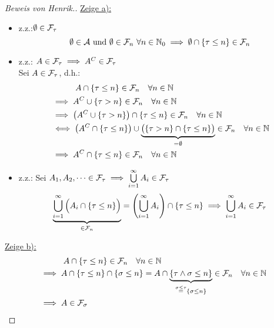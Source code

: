 \documentclass[12pt,a4paper]{article}
\begin{document}
\begin{proof}[Beweis von Henrik.]\enter
\underline{Zeige a):}\\
\begin{itemize} 
	\item z.z.:$\emptyset \in \mathcal{F}_\tau$\\
	\begin{equation*}
		\emptyset \in \mathcal{A} \text{ und } \emptyset \in \mathcal{F}_n\  \forall n \in \mathbb{N}_0 \implies \emptyset \cap \{\tau \leq n\} \in \mathcal{F}_n
	\end{equation*}
	\item z.z.: $A \in \mathcal{F}_\tau \implies A^C \in \mathcal{F}_\tau$\\
	Sei $A \in \mathcal{F}_\tau$, d.h.:
	\begin{align*}
		&{}\qquad \quad  A \cap \{\tau \leq n\} \in \mathcal{F}_n \quad \forall n \in \mathbb{N}\\
		&\implies	A^C \cup \{\tau > n\} \in \mathcal{F}_n \quad \forall n \in \mathbb{N}\\
		&\implies 	\left(	A^C \cup \{\tau > n\}\right) \cap \{\tau \leq n\} \in \mathcal{F}_n \quad \forall n \in \mathbb{N}\\
		& \iff \left(	A^C \cap \{\tau \leq n\}\right) \cup \underbrace{\big ( \{\tau > n\}\cap\{\tau \leq n\} \big )}_{= \emptyset} \in \mathcal{F}_n \quad \forall n \in \mathbb{N}\\
		&\implies A^C \cap \{\tau \leq n\} \in \mathcal{F}_n \quad \forall n \in \mathbb{N}
	\end{align*}
	
	\item z.z.: Sei $A_1, A_2,\dots \in \mathcal{F}_\tau \implies \bigcup\limits_{i=1}^{\infty} A_i  \in \mathcal{F}_\tau$\\
	\begin{equation*}
		\underbrace{\bigcup\limits_{i=1}^{\infty} \Big (A_i \cap \{\tau \leq n\} \Big )}_{\in \mathcal{F}_n} = \left( \bigcup\limits_{i=1}^{\infty} A_i \right)\cap \{\tau \leq n\} \implies  \bigcup\limits_{i=1}^{\infty} A_i \in \mathcal{F}_\tau
	\end{equation*}
	
\end{itemize}

\underline{Zeige b):}\\
\begin{align*}
	&{}\qquad \quad  A \cap \{\tau \leq n\}  \in \mathcal{F}_n \quad \forall n \in \mathbb{N}\\
	&\implies A \cap \{\tau \leq n\} \cap \{\sigma \leq n\} = A \cap \underbrace{ \{\tau \land \sigma \leq n\}}_{ \overset{\sigma \leq \tau}{=} \{\sigma \leq n\} } \in \mathcal{F}_n \quad \forall n \in \mathbb{N}\\
	&\implies A \in \mathcal{F}_\sigma \\
\end{align*}



\end{proof}
\end{document}
